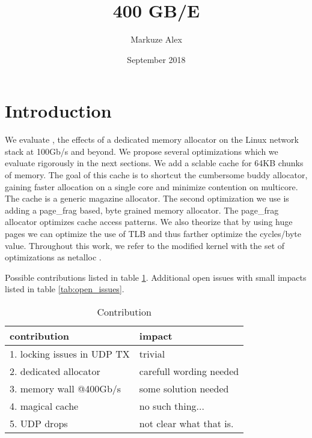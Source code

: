 \documentclass[sigplan,10pt]{acmart}
\title{400 GB/E}
\author{Markuze Alex}
\date{September 2018}
\newcommand{\oursys}{netalloc }
\begin{document}
\maketitle
\section{Introduction}
We evaluate , the effects of a dedicated memory allocator on the Linux network stack at 100Gb/s and beyond.
We propose several optimizations which we evaluate rigorously in the next sections. We add a sclable cache for 64KB chunks of memory. The goal of this cache is to shortcut the cumbersome buddy allocator, gaining faster allocation on a single core and minimize contention on multicore. The cache is a generic magazine allocator.
The second optimization we use is adding a page\_frag based, byte grained memory allocator. The page\_frag allocator optimizes cache access patterns.
We also theorize that by using huge pages we can optimize the use of TLB and thus farther optimize the cycles/byte value.
Throughout this work, we refer to the modified kernel with the set of optimizations as \oursys.

Possible contributions listed in table \ref{tab:contributions}.
Additional open issues with small impacts listed in table \ref{tab:open_issues}.
\begin{table}[b]
\centering
\begin{tabular}{l|l}
contribution & impact \\\hline
1. locking issues in UDP TX & trivial\\
2. dedicated allocator & carefull wording needed\\
3. memory wall @400Gb/s & some solution needed\\
4. magical cache & no such thing...\\
5. UDP drops & not clear what that is.\\
\hline
\end{tabular}
\caption{\label{tab:contributions}Contribution}
\end{table}

\newpage




\renewcommand\footnotetextcopyrightpermission[1]{}
\end{document}
